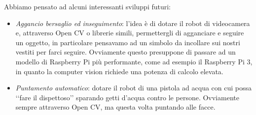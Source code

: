 \documentclass[12pt]{article}
\newcommand{\cbegin}{‘‘}
\newcommand{\cend}{’’}
\newcommand{\raspi}{Raspberry Pi}
\begin{document}
Abbiamo pensato ad alcuni interessanti sviluppi futuri:

\begin{itemize}
\item \emph{Aggancio bersaglio ed inseguimento}: l'idea è di dotare il robot di videocamera e, attraverso Open CV o librerie simili, permettergli di agganciare e seguire un oggetto, in particolare pensavamo ad un simbolo da incollare sui nostri vestiti per farci seguire. Ovviamente questo presuppone di passare ad un modello di \raspi{} più performante, come ad esempio il \raspi{} 3, in quanto la computer vision richiede una potenza di calcolo elevata.
\item \emph{Puntamento automatico}: dotare il robot di una pistola ad acqua con cui possa \cbegin fare il dispettoso\cend{} sparando getti d'acqua contro le persone. Ovviamente sempre attraverso Open CV, ma questa volta puntando alle facce.

\end{itemize}
\end{document}
